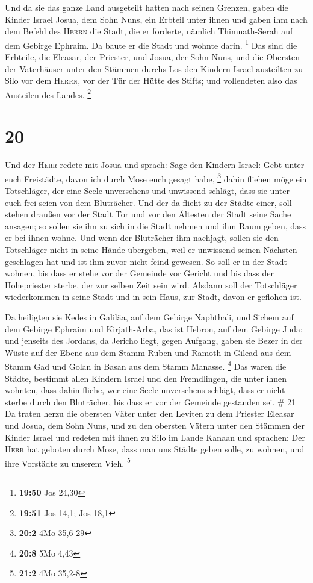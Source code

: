  Und da sie das ganze Land ausgeteilt hatten nach seinen
Grenzen, gaben die Kinder Israel Josua, dem Sohn Nuns, ein Erbteil unter
ihnen  und gaben ihm nach dem Befehl des \textsc{Herrn}
die Stadt, die er forderte, nämlich Thimnath-Serah auf dem Gebirge
Ephraim. Da baute er die Stadt und wohnte darin. \footnote{\textbf{19:50}
  Jos 24,30}  Das sind die Erbteile, die Eleasar, der
Priester, und Josua, der Sohn Nuns, und die Obersten der Vaterhäuser
unter den Stämmen durchs Los den Kindern Israel austeilten zu Silo vor
dem \textsc{Herrn}, vor der Tür der Hütte des Stifts; und vollendeten
also das Austeilen des Landes. \footnote{\textbf{19:51} Jos 14,1; Jos
  18,1}

\hypertarget{section-10}{%
\section{20}\label{section-10}}

 Und der \textsc{Herr} redete mit Josua und sprach:
 Sage den Kindern Israel: Gebt unter euch Freistädte,
davon ich durch Mose euch gesagt habe, \footnote{\textbf{20:2} 4Mo
  35,6-29}  dahin fliehen möge ein Totschläger, der eine
Seele unversehens und unwissend schlägt, dass sie unter euch frei seien
von dem Bluträcher.  Und der da flieht zu der Städte
einer, soll stehen draußen vor der Stadt Tor und vor den Ältesten der
Stadt seine Sache ansagen; so sollen sie ihn zu sich in die Stadt nehmen
und ihm Raum geben, dass er bei ihnen wohne.  Und wenn der
Bluträcher ihm nachjagt, sollen sie den Totschläger nicht in seine Hände
übergeben, weil er unwissend seinen Nächsten geschlagen hat und ist ihm
zuvor nicht feind gewesen.  So soll er in der Stadt
wohnen, bis dass er stehe vor der Gemeinde vor Gericht und bis dass der
Hohepriester sterbe, der zur selben Zeit sein wird. Alsdann soll der
Totschläger wiederkommen in seine Stadt und in sein Haus, zur Stadt,
davon er geflohen ist.

 Da heiligten sie Kedes in Galiläa, auf dem Gebirge
Naphthali, und Sichem auf dem Gebirge Ephraim und Kirjath-Arba, das ist
Hebron, auf dem Gebirge Juda;  und jenseits des Jordans,
da Jericho liegt, gegen Aufgang, gaben sie Bezer in der Wüste auf der
Ebene aus dem Stamm Ruben und Ramoth in Gilead aus dem Stamm Gad und
Golan in Basan aus dem Stamm Manasse. \footnote{\textbf{20:8} 5Mo 4,43}
 Das waren die Städte, bestimmt allen Kindern Israel und
den Fremdlingen, die unter ihnen wohnten, dass dahin fliehe, wer eine
Seele unversehens schlägt, dass er nicht sterbe durch den Bluträcher,
bis dass er vor der Gemeinde gestanden sei. \# 21  Da
traten herzu die obersten Väter unter den Leviten zu dem Priester
Eleasar und Josua, dem Sohn Nuns, und zu den obersten Vätern unter den
Stämmen der Kinder Israel  und redeten mit ihnen zu Silo
im Lande Kanaan und sprachen: Der \textsc{Herr} hat geboten durch Mose,
dass man uns Städte geben solle, zu wohnen, und ihre Vorstädte zu
unserem Vieh. \footnote{\textbf{21:2} 4Mo 35,2-8}

